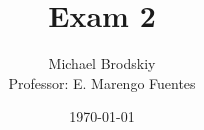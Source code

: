 


\title{Exam 2}
\date{\today}
\author{Michael Brodskiy\\ \small Professor: E. Marengo Fuentes}



\maketitle

